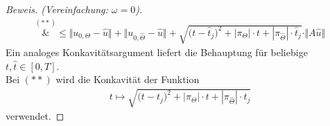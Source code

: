 \begin{proof}[Beweis. (Vereinfachung: $\omega=0$)]
\begin{align*}
\overset{(\ast\ast)}&\leq
\big\Vert u_{0,\Theta}-\hat{u}\big\Vert+\big\Vert u_{0,\hat{\Theta}}-\hat{u}\big\Vert
+\sqrt{\big(t-\hat{t}_j\big)^2+|\pi_\Theta|\cdot t+|\pi_{\hat{\Theta}}|\cdot\hat{t}_j}\cdot\Vert A\hat{u}\Vert
\end{align*}
Ein analoges Konkavitätsargument liefert die Behauptung für beliebige $t,\hat{t}\in[0,T]$.\\
Bei $(\ast\ast)$ wird die Konkavität der Funktion 
\begin{align*}
t\mapsto\sqrt{\big(t-t_j)^2+|\pi_\Theta|\cdot t+|\pi_{\hat{\Theta}}|\cdot\hat{t}_j}
\end{align*}
verwendet.
\end{proof}